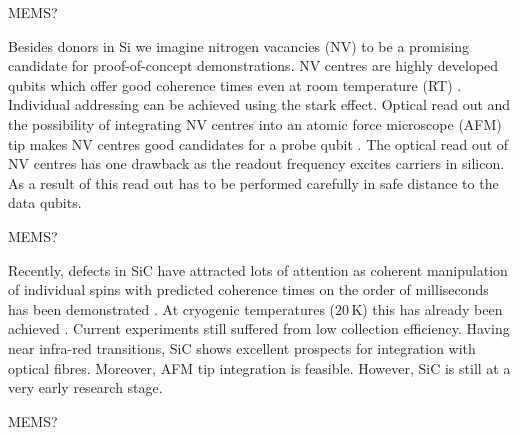 MEMS?


Besides donors in Si we imagine nitrogen vacancies (NV) to be a promising candidate for proof-of-concept demonstrations. NV centres are highly developed qubits \cite{Bar-Gill2013} which offer good coherence times even at room temperature (RT) \cite{Balasubramanian2009}. Individual addressing can be achieved using the stark effect. Optical read out and the possibility of integrating NV centres into an atomic force microscope (AFM) tip makes NV centres good candidates for a probe qubit \cite{Grinolds2013}. The optical read out of NV centres has one drawback as the readout frequency excites carriers in silicon. As a result of this read out has to be performed carefully in safe distance to the data qubits.

MEMS?

Recently, defects in SiC have attracted lots of attention \cite{Morello2015} as coherent manipulation of individual spins with predicted coherence times on the order of milliseconds has been demonstrated \cite{Widmann2014}. At cryogenic temperatures ($20\, $K) this has already been achieved \cite{Christle2014}. Current experiments still suffered from low collection efficiency. Having near infra-red transitions, SiC shows excellent prospects for integration with optical fibres. Moreover, AFM tip integration is feasible. However, SiC is still at a very early research stage.  

MEMS?

